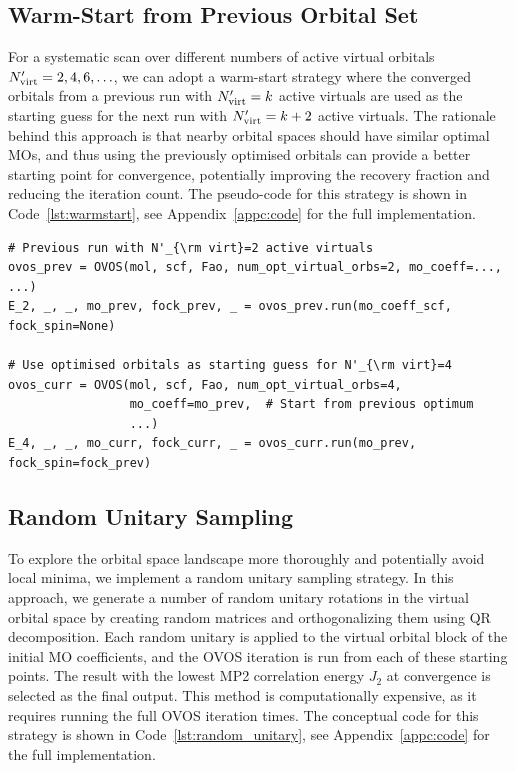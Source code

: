 \subsection{Warm-Start from Previous Orbital Set}

For a systematic scan over different numbers of active virtual orbitals $N'_{\rm virt} = 2, 4, 6, \ldots$, we can adopt a warm-start strategy where the converged orbitals from a previous run with $N'_{\rm virt}=k$ active virtuals are used as the starting guess for the next run with $N'_{\rm virt}=k+2$ active virtuals. The rationale behind this approach is that nearby orbital spaces should have similar optimal MOs, and thus using the previously optimised orbitals can provide a better starting point for convergence, potentially improving the recovery fraction and reducing the iteration count. The pseudo-code for this strategy is shown in Code~\ref{lst:warmstart}, see Appendix~\ref{appc:code} for the full implementation.

\begin{lstlisting}[style=python, caption={Warm-start strategy (pseudo-code for expansion)}, label=lst:warmstart]
# Previous run with N'_{\rm virt}=2 active virtuals
ovos_prev = OVOS(mol, scf, Fao, num_opt_virtual_orbs=2, mo_coeff=..., ...)
E_2, _, _, mo_prev, fock_prev, _ = ovos_prev.run(mo_coeff_scf, fock_spin=None)

# Use optimised orbitals as starting guess for N'_{\rm virt}=4
ovos_curr = OVOS(mol, scf, Fao, num_opt_virtual_orbs=4, 
                 mo_coeff=mo_prev,  # Start from previous optimum
                 ...)
E_4, _, _, mo_curr, fock_curr, _ = ovos_curr.run(mo_prev, fock_spin=fock_prev)
\end{lstlisting}


\subsection{Random Unitary Sampling}

To explore the orbital space landscape more thoroughly and potentially avoid local minima, we implement a random unitary sampling strategy. In this approach, we generate a number of random unitary rotations in the virtual orbital space by creating random matrices and orthogonalizing them using QR decomposition. Each random unitary is applied to the virtual orbital block of the initial MO coefficients, and the OVOS iteration is run from each of these starting points. The result with the lowest MP2 correlation energy $J_2$ at convergence is selected as the final output. This method is computationally expensive, as it requires running the full OVOS iteration  times. The conceptual code for this strategy is shown in Code~\ref{lst:random_unitary}, see Appendix~\ref{appc:code} for the full implementation.

